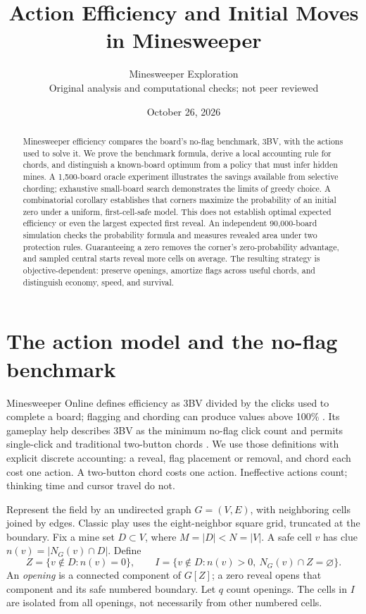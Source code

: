 \documentclass[11pt,letterpaper]{article}
\title{Action Efficiency and Initial Moves in Minesweeper}
\author{Minesweeper Exploration\\\small Original analysis and computational checks; not peer reviewed}
\date{October 26, 2026}
\begin{document}
\maketitle
\begin{abstract}
Minesweeper efficiency compares the board's no-flag benchmark, 3BV, with the actions used to solve it. We prove the benchmark formula, derive a local accounting rule for chords, and distinguish a known-board optimum from a policy that must infer hidden mines. A 1,500-board oracle experiment illustrates the savings available from selective chording; exhaustive small-board search demonstrates the limits of greedy choice. A combinatorial corollary establishes that corners maximize the probability of an initial zero under a uniform, first-cell-safe model. This does not establish optimal expected efficiency or even the largest expected first reveal. An independent 90,000-board simulation checks the probability formula and measures revealed area under two protection rules. Guaranteeing a zero removes the corner's zero-probability advantage, and sampled central starts reveal more cells on average. The resulting strategy is objective-dependent: preserve openings, amortize flags across useful chords, and distinguish economy, speed, and survival.
\end{abstract}

\section{The action model and the no-flag benchmark}
Minesweeper Online defines efficiency as 3BV divided by the clicks used to complete a board; flagging and chording can produce values above 100\% \cite{efficiency}. Its gameplay help describes 3BV as the minimum no-flag click count and permits single-click and traditional two-button chords \cite{gameplay}. We use those definitions with explicit discrete accounting: a reveal, flag placement or removal, and chord each cost one action. A two-button chord costs one action. Ineffective actions count; thinking time and cursor travel do not.

Represent the field by an undirected graph $G=(V,E)$, with neighboring cells joined by edges. Classic play uses the eight-neighbor square grid, truncated at the boundary. Fix a mine set $D\subset V$, where $M=|D|<N=|V|$. A safe cell $v$ has clue $n(v)=|N_G(v)\cap D|$. Define
\[
 Z=\{v\notin D:n(v)=0\},\qquad
 I=\{v\notin D:n(v)>0,\ N_G(v)\cap Z=\varnothing\}.
\]
An \emph{opening} is a connected component of $G[Z]$; a zero reveal opens that component and its safe numbered boundary. Let $q$ count openings. The cells in $I$ are isolated from all openings, not necessarily from other numbered cells.
\end{document}
